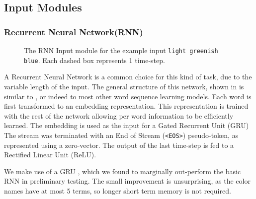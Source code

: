 \documentclass[11pt,a4paper]{article}
\newcommand{\parencite}{\citep}
\newcommand{\textcite}{\citet}
\newcommand{\natlang}[1]{\texttt{#1}}
\begin{document}
\subsection{Input Modules} 


\subsubsection{Recurrent Neural Network(RNN)}
\begin{figure}

	\caption{The RNN Input module for the example input \natlang{light greenish blue}. Each dashed box represents 1 time-step. \label{fig:rnnmod}}
\end{figure}


A Recurrent Neural Network is a common choice for this kind of task,
due to the variable length of the input.
The general structure of this network, shown in  is similar to \textcite{2016arXiv160603821M}, or indeed to most other word sequence learning models.
Each word is first transformed to an embedding representation.
This representation is trained with the rest of the network allowing per word information to be efficiently learned.
The embedding is used as the input for a Gated Recurrent Unit (GRU) 
The stream was terminated with an End of Stream (\natlang{<EOS>}) pseudo-token,
as represented using a zero-vector.
The output of the last time-step is fed to a Rectified Linear Unit (ReLU).

We make use of a GRU \parencite{cho2014properties},
which we found to marginally out-perform the basic RNN in preliminary testing.
The small improvement is unsurprising, as the color names have at most 5 terms,
so longer short term memory is not required.
\end{document}
